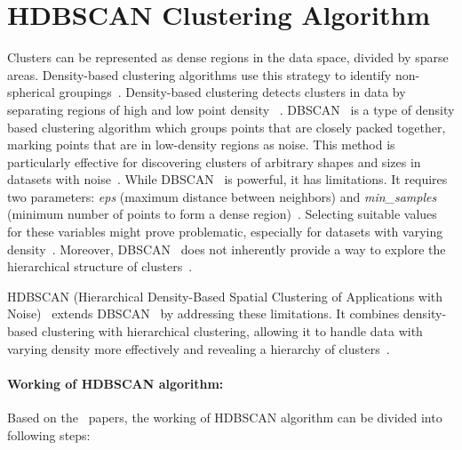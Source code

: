 \section{HDBSCAN Clustering Algorithm}
Clusters can be represented as dense regions in the data space, divided by sparse areas. Density-based clustering algorithms use this strategy to identify non-spherical groupings~\citep{density_based_clustering_book_han2011data}. Density-based clustering detects clusters in data by separating regions of high and low point density ~\citep{density_based_clustering_book_han2011data}. DBSCAN~\citep{DBSCAN_algo_ester1996density} is a type of density based clustering algorithm which groups points that are closely packed together, marking points that are in low-density regions as noise. This method is particularly effective for discovering clusters of arbitrary shapes and sizes in datasets with noise~\citep{hdbscanComparingPython}. While DBSCAN~\citep{DBSCAN_algo_ester1996density} is powerful, it has limitations. It requires two parameters: \textit{eps} (maximum distance between neighbors) and \textit{min\_samples} (minimum number of points to form a dense region)~\citep{DBSCAN_algo_ester1996density, hdbscanComparingPython}. Selecting suitable values for these variables might prove problematic, especially for datasets with varying density~\citep{hdbscanComparingPython}. Moreover, DBSCAN~\citep{DBSCAN_algo_ester1996density} does not inherently provide a way to explore the hierarchical structure of clusters~\citep{hdbscanComparingPython}.

HDBSCAN (Hierarchical Density-Based Spatial Clustering of Applications with Noise)~\citep{HDBSCAN_algo_campello2013density} extends DBSCAN~\citep{DBSCAN_algo_ester1996density} by addressing these limitations. It combines density-based clustering with hierarchical clustering, allowing it to handle data with varying density more effectively and revealing a hierarchy of clusters~\citep{hdbscanComparingPython}.

\newpage

\paragraph{Working of HDBSCAN algorithm:} Based on the~\citep{HDBSCAN_algo_campello2013density, HDBSCAN_2015_campello2015hierarchical} papers, the working of HDBSCAN algorithm can be divided into following steps:

